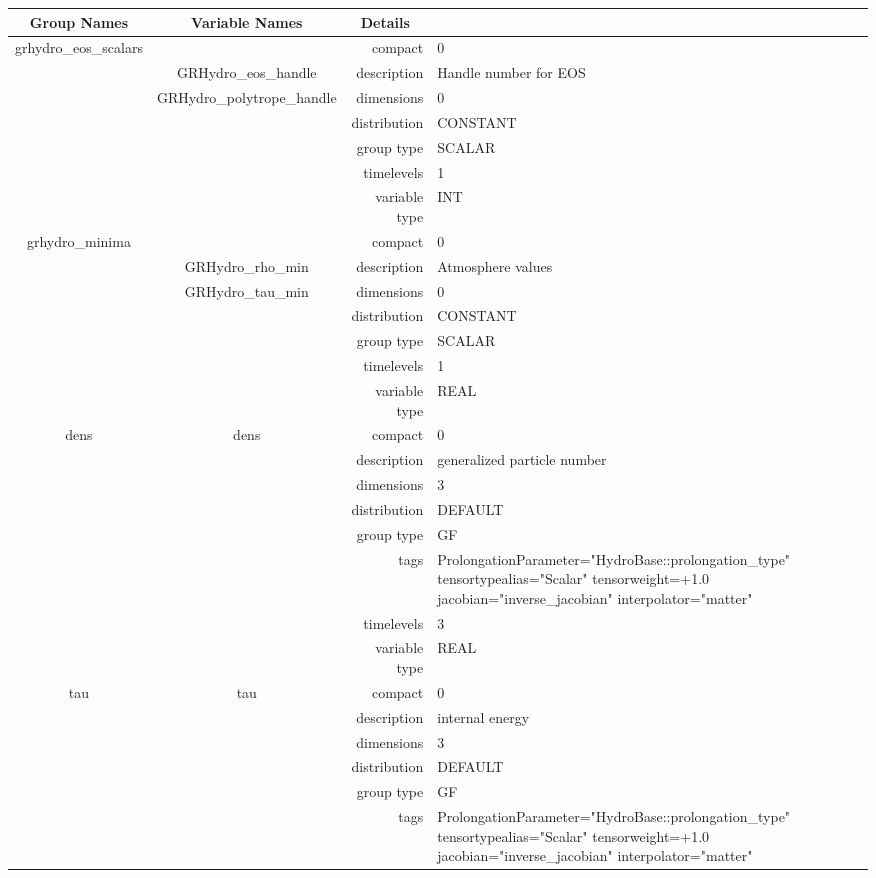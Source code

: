 \documentclass{article}
\begin{document}
\begin{tabular*}{150mm}{|c|c@{\extracolsep{\fill}}|rl|} \hline 
~ {\bf Group Names} ~ & ~ {\bf Variable Names} ~  &{\bf Details} ~ & ~\\ 
\hline 
grhydro\_eos\_scalars &  & compact & 0 \\ 
 & GRHydro\_eos\_handle & description & Handle number for EOS \\ 
 & GRHydro\_polytrope\_handle & dimensions & 0 \\ 
 &  & distribution & CONSTANT \\ 
 &  & group type & SCALAR \\ 
 &  & timelevels & 1 \\ 
 &  & variable type & INT \\ 
\hline 
grhydro\_minima &  & compact & 0 \\ 
 & GRHydro\_rho\_min & description & Atmosphere values \\ 
 & GRHydro\_tau\_min & dimensions & 0 \\ 
 &  & distribution & CONSTANT \\ 
 &  & group type & SCALAR \\ 
 &  & timelevels & 1 \\ 
 &  & variable type & REAL \\ 
\hline 
dens & dens & compact & 0 \\ 
 &  & description & generalized particle number \\ 
 &  & dimensions & 3 \\ 
 &  & distribution & DEFAULT \\ 
 &  & group type & GF \\ 
 &  & tags & ProlongationParameter="HydroBase::prolongation\_type" tensortypealias="Scalar" tensorweight=+1.0 jacobian="inverse\_jacobian" interpolator="matter" \\ 
 &  & timelevels & 3 \\ 
 &  & variable type & REAL \\ 
\hline 
tau & tau & compact & 0 \\ 
 &  & description & internal energy \\ 
 &  & dimensions & 3 \\ 
 &  & distribution & DEFAULT \\ 
 &  & group type & GF \\ 
 &  & tags & ProlongationParameter="HydroBase::prolongation\_type" tensortypealias="Scalar" tensorweight=+1.0 jacobian="inverse\_jacobian" interpolator="matter" \\ 

\end{tabular*}
\end{document}
